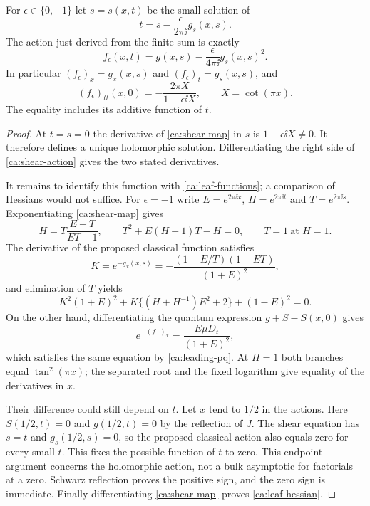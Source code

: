 \begin{proposition}\label{ca:shear}
For $\epsilon\in\{0,\pm1\}$ let $s=s(x,t)$ be the small solution of
\begin{equation}\label{ca:shear-map}
 t=s-\frac{\epsilon}{2\pi\ii}g_s(x,s).
\end{equation}
The action just derived from the finite sum is exactly
\begin{equation}\label{ca:shear-action}
 f_\epsilon(x,t)=g(x,s)
                 -\frac{\epsilon}{4\pi\ii}g_s(x,s)^2.
\end{equation}
In particular $(f_\epsilon)_x=g_x(x,s)$ and
$(f_\epsilon)_t=g_s(x,s)$, and
\begin{equation}\label{ca:leaf-hessian}
 (f_\epsilon)_{tt}(x,0)
     =-\frac{2\pi X}{1-\epsilon\ii X},
 \qquad X=\cot(\pi x).
\end{equation}
The equality includes its additive function of $t$.
\end{proposition}

\begin{proof}
At $t=s=0$ the derivative of \eqref{ca:shear-map} in $s$ is
$1-\epsilon\ii X\ne0$. It therefore defines a unique holomorphic solution. Differentiating the right side of \eqref{ca:shear-action} gives the two stated derivatives.

It remains to identify this function with \eqref{ca:leaf-functions}; a comparison of Hessians would not suffice. For $\epsilon=-1$ write
$E=e^{2\pi\ii x}$, $H=e^{2\pi\ii t}$ and $T=e^{2\pi\ii s}$. Exponentiating \eqref{ca:shear-map} gives
\[
 H=T\frac{E-T}{ET-1},\qquad
 T^2+E(H-1)T-H=0,\qquad T=1\ \text{at }H=1.
\]
The derivative of the proposed classical function satisfies
\[
 K=e^{-g_x(x,s)}
   =-\frac{(1-E/T)(1-ET)}{(1+E)^2},
\]
and elimination of $T$ yields
\[
 K^2(1+E)^2+K\{(H+H^{-1})E^2+2\}+(1-E)^2=0.
\]
On the other hand, differentiating the quantum expression $g+S-S(x,0)$ gives
\[
 e^{-(f_-)_x}=\frac{E\mu D_t}{(1+E)^2},
\]
which satisfies the same equation by \eqref{ca:leading-pq}. At $H=1$ both branches equal $\tan^2(\pi x)$; the separated root and the fixed logarithm give equality of the derivatives in $x$.

Their difference could still depend on $t$. Let $x$ tend to $1/2$ in the actions. Here $S(1/2,t)=0$ and
$g(1/2,t)=0$ by the reflection of $J$. The shear equation has $s=t$ and $g_s(1/2,s)=0$, so the proposed classical action also equals zero for every small $t$. This fixes the possible function of $t$ to zero. This endpoint argument concerns the holomorphic action, not a bulk asymptotic for factorials at a zero. Schwarz reflection proves the positive sign, and the zero sign is immediate. Finally differentiating \eqref{ca:shear-map} proves \eqref{ca:leaf-hessian}.
\end{proof}
